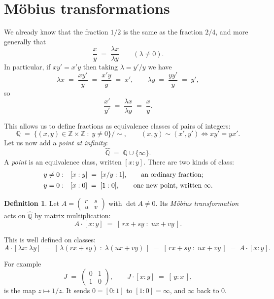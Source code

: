 \documentclass[12pt,a4paper]{article}
\theoremstyle{plain}
\theoremstyle{definition}
\newtheorem{definition}[theorem]{Definition}
\begin{document}
\section{M\"obius transformations}

We already know that the fraction $1/2$ is the same as the fraction $2/4$, and
more generally that
\[
  \frac{x}{y} \;=\; \frac{\lambda x}{\lambda y} \qquad (\lambda \neq 0) .
\]
In particular, if $xy' = x'y$ then taking $\lambda = y'/y$ we have
\[
  \lambda x \;=\; \frac{xy'}{y} \;=\; \frac{x'y}{y} \;=\; x' ,
  \qquad
  \lambda y \;=\; \frac{yy'}{y} \;=\; y' ,
\]
so
\[
  \frac{x'}{y'} \;=\; \frac{\lambda x}{\lambda y} \;=\; \frac{x}{y} .
\]

This allows us to define fractions as equivalence classes of pairs of integers:
\[
  \mathbb{Q} \;=\; \bigl\{ (x,y) \in \mathbb{Z} \times \mathbb{Z}
    \;:\; y \neq 0 \bigr\} \big/ \sim ,
  \qquad
  (x,y) \sim (x',y') \iff x y' = y x' .
\]
Let us now add a \emph{point at infinity}:
\[
  \widehat{\mathbb{Q}} \;=\; \mathbb{Q} \cup \{\infty\} .
\]
A \emph{point} is an equivalence class, written $[x : y]$. There are two kinds
of class:
\[
  \begin{array}{r@{\quad}l}
    y \neq 0 : & [x : y] \;=\; [x/y : 1] ,
      \qquad\text{an ordinary fraction;}\\[4pt]
    y = 0 :    & [x : 0] \;=\; [1 : 0] ,
      \qquad\text{one new point, written } \infty .
  \end{array}
\]

\begin{definition}
Let $A = \begin{pmatrix} r & s \\ u & v\end{pmatrix}$ with $\det A \neq 0$. Its
\emph{M\"obius transformation} acts on $\widehat{\mathbb{Q}}$ by matrix
multiplication:
\[
  A \cdot [x : y] \;=\; [\,rx + sy \;:\; ux + vy\,] .
\]
\end{definition}

\noindent
This is well defined on classes:
\[
  A \cdot [\lambda x : \lambda y]
    \;=\; [\,\lambda(rx+sy) \;:\; \lambda(ux+vy)\,]
    \;=\; [\,rx+sy \;:\; ux+vy\,]
    \;=\; A \cdot [x : y] .
\]

For example
\[
  J \;=\; \begin{pmatrix} 0 & 1 \\ 1 & 0 \end{pmatrix} ,
  \qquad
  J \cdot [x : y] \;=\; [\,y : x\,] ,
\]
is the map $z \mapsto 1/z$. It sends $0 = [0:1]$ to $[1:0] = \infty$, and
$\infty$ back to $0$.
\end{document}
